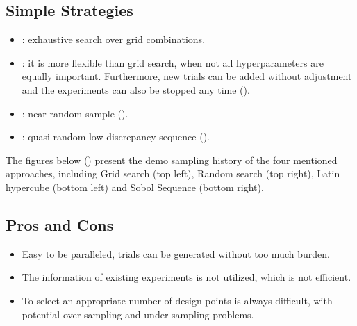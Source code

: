 \documentclass[letterpaper,10pt,english]{sphinxmanual}
\begin{document}
\subsection{Simple Strategies}
\label{\detokenize{pybatdoe:simple-strategies}}\begin{itemize}
\item {} 
: exhaustive search over grid combinations.

\item {} 
: it is more flexible than grid search, when not all hyperparameters are equally important. Furthermore, new trials can be added without adjustment and the experiments can also be stopped any time ().

\item {} 
: near-random sample ().

\item {} 
: quasi-random low-discrepancy sequence ().

\end{itemize}

The figures below () present the demo sampling history of the four mentioned approaches, including Grid search (top left), Random search (top right), Latin hypercube (bottom left) and Sobol Sequence (bottom right).

   


\subsection{Pros and Cons}
\label{\detokenize{pybatdoe:pros-and-cons}}\begin{itemize}
\item {} 
Easy to be paralleled, trials can be generated without too much burden.

\item {} 
The information of existing experiments is not utilized, which is not efficient.

\item {} 
To select an appropriate number of design points is always difficult, with potential over-sampling and under-sampling problems.

\end{itemize}
\end{document}
